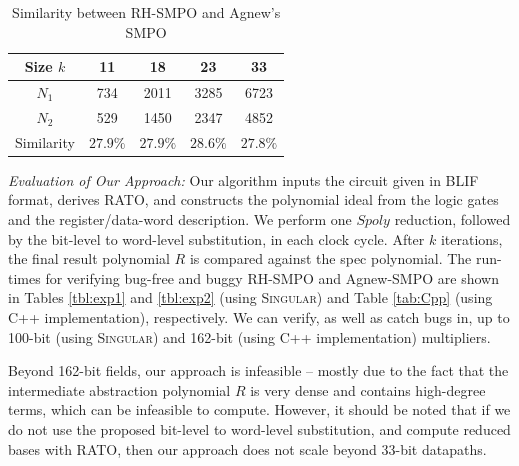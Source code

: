 \begin{table}[htb]
\centering
\caption{\small Similarity between RH-SMPO and Agnew's SMPO}
\label{tbl:fraig}
\begin{tabular}{|c||c|c|c|c|} 
\hline
Size $k$ & 11 & 18 & 23 & 33 \\
\hline
$N_1$ & 734  & 2011  & 3285  & 6723\\
\hline
$N_2$ & 529 & 1450 & 2347 & 4852\\
\hline
Similarity & $27.9\%$ & $27.9\%$ & $28.6\%$ & $27.8\%$  \\
\hline
\end{tabular}\label{table:similarity}  
\end{table} 

{\it Evaluation of Our Approach:} Our algorithm inputs the circuit
given in BLIF format, derives RATO, and constructs the polynomial
ideal from the logic gates and the register/data-word description.  We
perform one $Spoly$ reduction, followed by the bit-level to word-level 
substitution, in each clock cycle. After $k$ iterations, the final
result polynomial $R$ is compared against the spec polynomial. The
run-times for verifying bug-free and buggy RH-SMPO and Agnew-SMPO are
shown in Tables \ref{tbl:exp1} and \ref{tbl:exp2} (using \textsc{Singular})
and Table \ref{tab:Cpp} (using C++ implementation), respectively. 
We can verify, as well as catch bugs in, up to 100-bit (using \textsc{Singular})
and 162-bit (using C++ implementation) multipliers. 

Beyond 162-bit fields, our approach is infeasible --
mostly due to the fact that the intermediate 
abstraction polynomial $R$ is very dense and contains high-degree
terms, which can be infeasible to compute. However, it should be noted
that if we do not use the proposed bit-level to word-level
substitution, and compute reduced \Grobner bases with RATO, then our
approach does not scale beyond 33-bit datapaths. 

